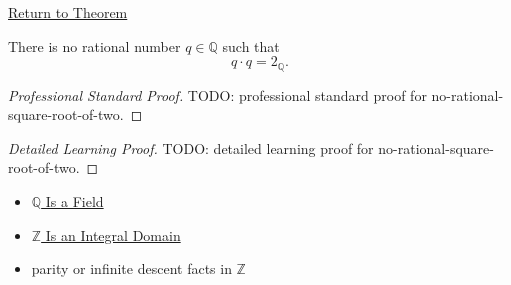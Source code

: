 \newpage
{}
\label{prf:no-rational-square-root-of-two}

\begin{remark*}[Return]
\hyperref[thm:no-rational-square-root-of-two]{Return to Theorem}
\end{remark*}

\begin{theorem*}
There is no rational number $q\in\mathbb{Q}$ such that
\[
q\cdot q=2_{\mathbb{Q}}.
\]
\end{theorem*}

\begin{proof}[Professional Standard Proof]
\LRAProofBodyStart
TODO: professional standard proof for no-rational-square-root-of-two.
\end{proof}

\begin{proof}[Detailed Learning Proof]
\LRAProofBodyStart
TODO: detailed learning proof for no-rational-square-root-of-two.
\end{proof}

\begin{remark*}
\end{remark*}

\begin{dependencies}
\begin{itemize}
  \item \hyperref[thm:q-is-a-field]{$\mathbb{Q}$ Is a Field}
  \item \hyperref[thm:z-integral-domain]{$\mathbb{Z}$ Is an Integral Domain}
  \item parity or infinite descent facts in $\mathbb{Z}$
\end{itemize}
\end{dependencies}

\clearpage
